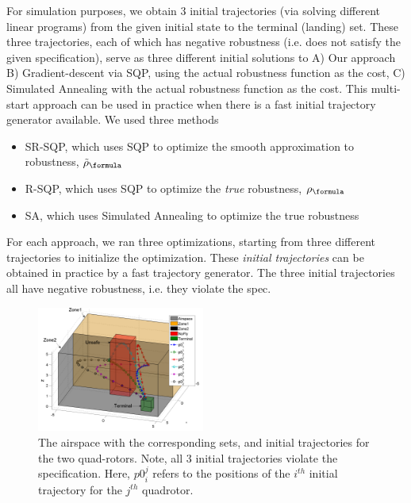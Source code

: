 For simulation purposes, 
we obtain 3 initial trajectories (via solving different linear programs) from the given initial state to the terminal (landing) set. These three trajectories, each of which has negative robustness (i.e. does not satisfy the given specification), serve as three different initial solutions to A) Our approach B) Gradient-descent via SQP, using the actual robustness function as the cost, C) Simulated Annealing with the actual robustness function as the cost. This multi-start approach can be used in practice when there is a fast initial trajectory generator available.
We used three methods 
\begin{itemize}
	\item SR-SQP, which uses SQP to optimize the smooth approximation to robustness, $\srobf$
	\item R-SQP, which uses SQP to optimize the \textit{true} robustness, $\robf$
	\item SA, which uses Simulated Annealing to optimize the true robustness
\end{itemize}
For each approach, we ran three optimizations, starting from three different trajectories to initialize the optimization. These \textit{initial trajectories} can be obtained in practice by a fast trajectory generator. 
The three initial trajectories all have negative robustness, i.e. they violate the spec.
\begin{figure}[t]
\centering
\includegraphics[width=0.49\textwidth]{figures/QuadInitTrajs_scissored}
\caption{The airspace with the corresponding sets, and initial trajectories for the two quad-rotors. Note, all 3 initial trajectories violate the specification. Here, $p0_{i}^j$ refers to the positions of the $i^{th}$ initial trajectory for the $j^{th}$ quadrotor. }
\label{fig:quad_init}
\end{figure}

